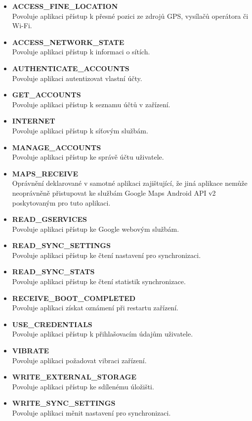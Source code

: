 \documentclass{diplomka}
\begin{document}
\begin{itemize}%
\item  \textbf{ACCESS\_FINE\_LOCATION}\\
Povoluje aplikaci přístup k přesné pozici ze zdrojů GPS, vysílačů operátora či Wi-Fi.
\item  \textbf{ACCESS\_NETWORK\_STATE}\\
Povoluje aplikaci přístup k informaci o sítích.
\item  \textbf{AUTHENTICATE\_ACCOUNTS}\\
Povoluje aplikaci autentizovat vlastní účty.
\item  \textbf{GET\_ACCOUNTS}\\
Povoluje aplikaci přístup k seznamu účtů v zařízení.
\item  \textbf{INTERNET}\\
Povoluje aplikaci přístup k síťovým službám.
\item  \textbf{MANAGE\_ACCOUNTS}\\
Povoluje aplikaci přístup ke správě účtu uživatele.
\item  \textbf{MAPS\_RECEIVE}\\
Oprávnění deklarované v samotné aplikaci zajištující, že jiná aplikace nemůže neoprávněně přistupovat ke službám Google Maps Android API v2 poskytovaným pro tuto aplikaci.
\item  \textbf{READ\_GSERVICES}\\
Povoluje aplikaci přístup ke Google webovým službám.
\item  \textbf{READ\_SYNC\_SETTINGS}\\
Povoluje aplikaci přístup ke čtení nastavení pro synchronizaci.
\item  \textbf{READ\_SYNC\_STATS}\\
Povoluje aplikaci přístup ke čtení statistik synchronizace.
\item  \textbf{RECEIVE\_BOOT\_COMPLETED}\\
Povoluje aplikaci získat oznámení při restartu zařízení.
\item  \textbf{USE\_CREDENTIALS}\\
Povoluje aplikaci přístup k přihlašovacím údajům uživatele.
\item  \textbf{VIBRATE}\\
Povoluje aplikaci požadovat vibraci zařízení.
\item  \textbf{WRITE\_EXTERNAL\_STORAGE}\\
Povoluje aplikaci přístup ke sdílenému úložišti.
\item  \textbf{WRITE\_SYNC\_SETTINGS}\\
Povoluje aplikaci měnit nastavení pro synchronizaci.
\end{itemize}
\end{document}
